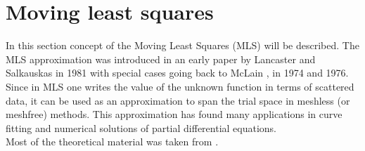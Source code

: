 \section{Moving least squares}
In this section concept of the Moving Least Squares (MLS) will be described. The MLS approximation was introduced in an early paper by Lancaster and Salkauskas  \cite{MLSSalkauskas} in 1981 with special cases going back to McLain  \cite{MLSMcLain1}, \cite{MLSMcLain2} in 1974 and 1976. Since in MLS one writes the value of the unknown function in terms of scattered data, it can be used as an approximation to span the trial space in meshless (or meshfree) methods. This approximation has found many applications in curve fitting and numerical solutions of partial differential equations.\\
Most of the theoretical material was taken from \cite{MLSIntro}.
